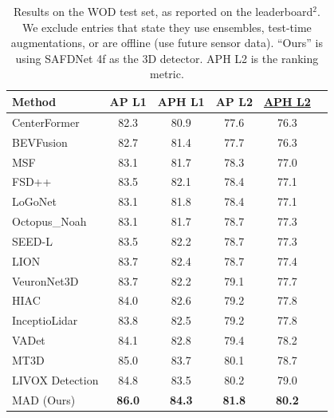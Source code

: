 \begin{table}[t]
    \centering
    \small
    \begin{tabular}{@{}lccccc@{}}
        \toprule
        Method                                            & AP L1             & APH L1           & AP L2            & \underline{APH L2} \\ 
        \midrule
        CenterFormer~\cite{zhou2022centerformer}      & 82.3 & 80.9 & 77.6 & 76.3 \\
        BEVFusion~\cite{liu2023bevfusion}             & 82.7 & 81.4 & 77.7 & 76.3 \\
        MSF~\cite{he2023msf}                          & 83.1 & 81.7 & 78.3 & 77.0 \\
        FSD++~\cite{fan2023super}                     & 83.5 & 82.1 & 78.4 & 77.1 \\
        LoGoNet~\cite{li2023logonet}                  & 83.1 & 81.8 & 78.4 & 77.1 \\
        Octopus\_Noah                                 & 83.1 & 81.7 & 78.7 & 77.3 \\
        SEED-L~\cite{liu2024seed}                       & 83.5 & 82.2 & 78.7 & 77.3 \\
        LION~\cite{liu2024lion}                       & 83.7 & 82.4 & 78.7 & 77.4 \\
        VeuronNet3D                                   & 83.7 & 82.2 & 79.1 & 77.7 \\
        HIAC                                          & 84.0 & 82.6 & 79.2 & 77.8 \\
        InceptioLidar                                 & 83.8 & 82.5 & 79.2 & 77.8 \\
        VADet                                         & 84.1 & 82.8 & 79.4 & 78.2 \\
        MT3D                                          & 85.0 & 83.7 & 80.1 & 78.7 \\
        LIVOX Detection                               & 84.8 & 83.5 & 80.2 & 79.0 \\
        \rowcolor{tablecolor} 
        MAD (Ours)                                    & \textbf{86.0}  & \textbf{84.3} & \textbf{81.8} & \textbf{80.2} \\
        \bottomrule
    \end{tabular}
    \caption{
    Results on the WOD test set, as reported on the leaderboard$^2$.
    We exclude entries that state they use ensembles, test-time augmentations, or are offline (use future sensor data).
    ``Ours'' is using SAFDNet 4f as the 3D detector.
    APH L2 is the ranking metric.
    }
    \vspace{-5mm}
    \label{tab:full-leaderboard}
\end{table}